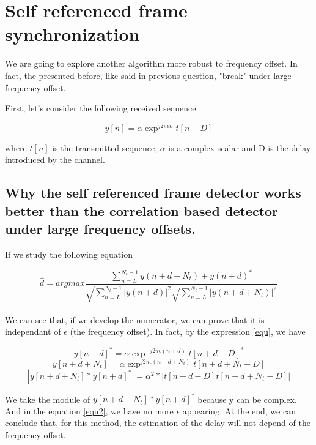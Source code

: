 \documentclass[frenchb, oneside, headings=normal]{scrartcl}
\begin{document}
\section{Self referenced frame synchronization}

We are going to explore another algorithm more robust to frequency offset. In fact, the presented before, like said in previous question, "break" under large frequency offset.

First, let's consider the following received sequence

\begin{equation}
y[n] = 	\alpha \exp^{j2\pi \epsilon n}t[n-D]
\label{equ} 
\end{equation}

where $t[n]$ is the transmitted sequence, $\alpha$ is a complex scalar and D is the delay 	introduced by the channel.

\subsection{Why the self referenced frame detector works better than the correlation based detector under large frequency offsets.}

If we study the following equation

\begin{equation}
\hat{d}=argmax \frac{\sum_{n=L}^{N_t-1} y(n+d+N_t)+y(n+d)^*}{\sqrt{\sum_{n=L}^{N_t-1} |y(n+d)|^2}\sqrt{\sum_{n=L}^{N_t-1} |y(n+d+N_t)|^2}}
\end{equation}\\

We can see that, if we develop the numerator, we can prove that it is independant of $\epsilon$ (the frequency offset). In fact, by the expression \ref{equ}, we have

\begin{equation}
y[n+d]^*= \alpha \exp^{-j2\pi \epsilon (n+d)}t[n+d-D]^*
\end{equation}
\begin{equation}
y[n+d+N_t]= \alpha \exp^{j2\pi \epsilon (n+d+N_t)}t[n+d+N_t-D]
\end{equation}
\begin{equation}
|y[n+d+N_t]*y[n+d]^*| = \alpha^2*|t[n+d-D]t[n+d+N_t-D]|
\label{equ2}
\end{equation} 	

We take the module of $y[n+d+N_t]*y[n+d]^*$ because y can be complex. And in the equation \ref{equ2}, we have no more $\epsilon$ appearing.
At the end, we can conclude that, for this method, the estimation of the delay will not depend of the frequency offset. 
\end{document}
